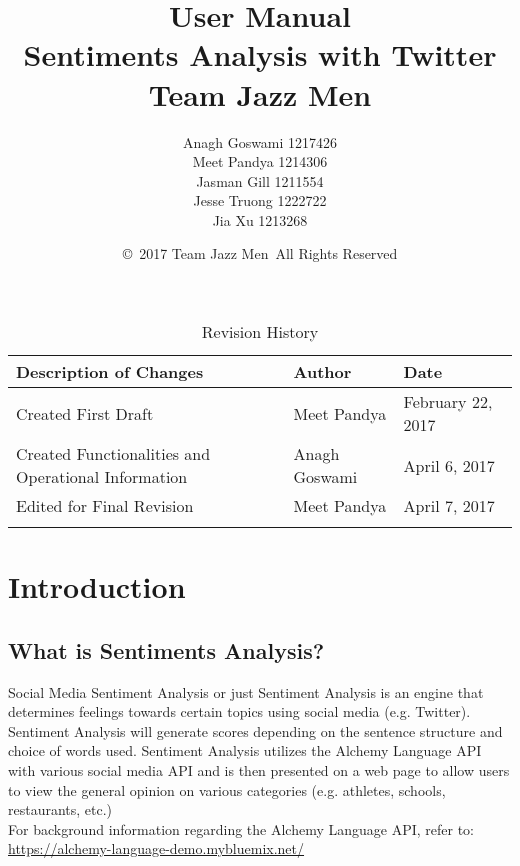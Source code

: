 \documentclass[12pt, titlepage]{article}
\begin{document}
\title{User Manual\\  Sentiments Analysis with Twitter \\Team Jazz Men}
\author{Anagh Goswami 1217426 \\ Meet Pandya 1214306 \\ Jasman Gill  1211554 \\ Jesse Truong  1222722 \\ Jia Xu  1213268 \\}
\date{\copyright\ 2017 Team Jazz Men\    All Rights Reserved} 

\maketitle


\tableofcontents 
\listoffigures

\listoftables



\begin{table}[h]
\centering
\caption{Revision History}
\begin{tabular}{|l|l|l|}
\Xhline{3\arrayrulewidth}
\bf Description of Changes & \bf Author & \bf Date\\\hline
Created First Draft & Meet Pandya & February 22, 2017\\\midrule
Created Functionalities and Operational Information &Anagh Goswami & April 6, 2017\\\bottomrule
Edited for Final Revision &Meet Pandya & April 7, 2017\\\bottomrule
\Xhline{3\arrayrulewidth}
\end{tabular}
\end{table}



\newpage


\section{Introduction}

\subsection{What is Sentiments Analysis?}
Social Media Sentiment Analysis or just Sentiment Analysis is an engine that determines feelings towards certain topics using social media (e.g. Twitter). Sentiment Analysis will generate scores depending on the sentence structure and choice of words used. Sentiment Analysis utilizes the Alchemy Language API with various social media API and is then presented on a web page to allow users to view the general opinion on various categories (e.g. athletes, schools, restaurants, etc.) \\
For background information regarding the Alchemy Language API, refer to: \url{https://alchemy-language-demo.mybluemix.net/}
\end{document}
